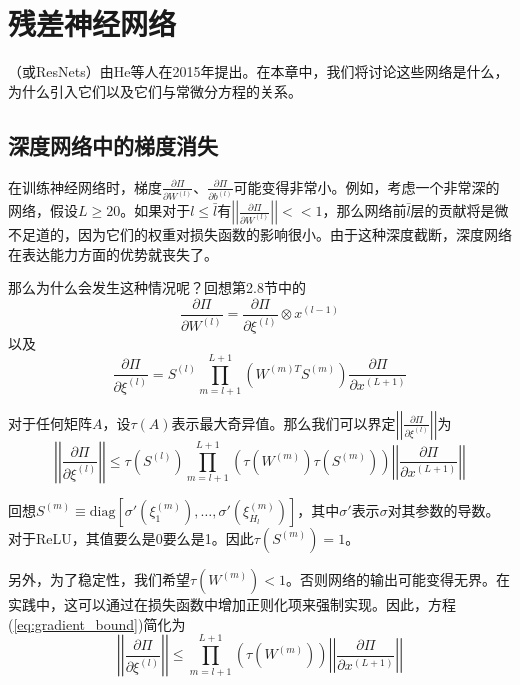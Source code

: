 \chapter{残差神经网络}
\label{chap:residual_networks}

（或ResNets）由He等人在2015年提出。在本章中，我们将讨论这些网络是什么，为什么引入它们以及它们与常微分方程的关系。

\section{深度网络中的梯度消失}
\label{sec:vanishing_gradients}

在训练神经网络时，梯度$\frac{\partial\Pi}{\partial W^{(l)}}$、$\frac{\partial\Pi}{\partial b^{(l)}}$可能变得非常小。例如，考虑一个非常深的网络，假设$L \geq 20$。如果对于$l \leq \bar{l}$有$\left|\left|\frac{\partial\Pi}{\partial W^{(l)}}\right|\right| << 1$，那么网络前$\bar{l}$层的贡献将是微不足道的，因为它们的权重对损失函数的影响很小。由于这种深度截断，深度网络在表达能力方面的优势就丧失了。

那么为什么会发生这种情况呢？回想第2.8节中的
\begin{equation}
\frac{\partial\Pi}{\partial W^{(l)}} = \frac{\partial\Pi}{\partial\xi^{(l)}} \otimes x^{(l-1)}
\end{equation}
以及
\begin{equation}
\frac{\partial\Pi}{\partial\xi^{(l)}} = S^{(l)} \prod_{m=l+1}^{L+1} \left(W^{(m)T} S^{(m)}\right) \frac{\partial\Pi}{\partial x^{(L+1)}}
\label{eq:gradient_chain}
\end{equation}

对于任何矩阵$A$，设$\tau(A)$表示最大奇异值。那么我们可以界定$\left|\left|\frac{\partial\Pi}{\partial\xi^{(l)}}\right|\right|$为
\begin{equation}
\left|\left|\frac{\partial\Pi}{\partial\xi^{(l)}}\right|\right| \leq \tau(S^{(l)}) \prod_{m=l+1}^{L+1} \left(\tau(W^{(m)}) \tau(S^{(m)})\right) \left|\left|\frac{\partial\Pi}{\partial x^{(L+1)}}\right|\right|
\label{eq:gradient_bound}
\end{equation}

回想$S^{(m)} \equiv \text{diag}[\sigma'(\xi_1^{(m)}), \ldots, \sigma'(\xi_{H_l}^{(m)})]$，其中$\sigma'$表示$\sigma$对其参数的导数。对于ReLU，其值要么是0要么是1。因此$\tau(S^{(m)}) = 1$。

另外，为了稳定性，我们希望$\tau(W^{(m)}) < 1$。否则网络的输出可能变得无界。在实践中，这可以通过在损失函数中增加正则化项来强制实现。因此，方程(\ref{eq:gradient_bound})简化为
\begin{equation}
\left|\left|\frac{\partial\Pi}{\partial\xi^{(l)}}\right|\right| \leq \prod_{m=l+1}^{L+1} \left(\tau(W^{(m)})\right) \left|\left|\frac{\partial\Pi}{\partial x^{(L+1)}}\right|\right|
\label{eq:gradient_bound_simplified}
\end{equation}

